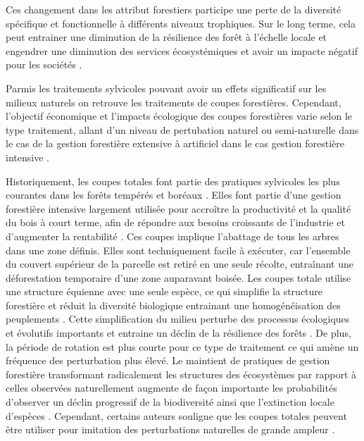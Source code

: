 Ces changement dans les attribut forestiers participe une perte de la diversité spécifique et fonctionnelle à différents niveaux trophiques. 
Sur le long terme, cela peut entrainer une diminution de la résilience des forêt à l'échelle locale et engendrer une diminution des services écosystémiques et avoir un impacte négatif pour les sociétés \citep{Hooper2012globalsynthesis,Edwards2014Maintainingecosystem}. 

Parmis les traitements sylvicoles pouvant avoir un effets significatif sur les milieux naturels on retrouve les traitements de coupes forestières.
Cependant, l'objectif économique et l'impacts écologique des coupes forestières varie selon le type traitement, allant d'un niveau de pertubation naturel ou semi-naturelle dans le cas de la gestion forestière extensive à artificiel dans le cas gestion forestière intensive \citep{Ameray2021Forestcarbon}. 

Historiquement, les coupes totales font partie des pratiques sylvicoles les plus courantes dans les forêts tempérés et boréaux \citep{Fedrowitz2014Canretention,Chaudhary2016Impactforest}. 
Elles font partie d'une gestion forestière intensive largement utilisée pour accroître la productivité et la qualité du bois à court terme, afin de répondre aux besoins croissants de l'industrie et d'augmenter la rentabilité \citep{Irland2011TimberProductivitya}.
Ces coupes implique l'abattage de tous les arbres dans une zone définis.
Elles sont techniquement facile à exécuter, car l'ensemble du couvert supérieur de la parcelle est retiré en une seule récolte, entraînant une déforestation temporaire d'une zone auparavant boisée. 
Les coupes totale utilise une structure équienne avec une seule espèce, ce qui simplifie la structure forestière et réduit la diversité biologique entrainant une homogénéisation des peuplements \citep{Rosenvald2008whatwhen}. 
Cette simplification du milieu perturbe des processus écologiques et évolutifs importants et entraine un déclin de la résilience des forêts \citep{Holling2001UnderstandingComplexity}. 
De plus, la période de rotation est plus courte pour ce type de traitement ce qui amène un fréquence des perturbation plus élevé. 
Le maintient de pratiques de gestion forestière transformant radicalement les structures des écosystèmes par rapport à celles observées naturellement augmente de façon importante les probabilités d'observer un déclin progressif de la biodiversité ainsi que l'extinction locale d'espèces \citep{Hanski2000Extinctiondebt}.  
Cependant, certains auteurs souligne que les coupes totales peuvent être utiliser pour imitation des perturbations naturelles de grande ampleur \citep{Greenberg1995comparisonbird}. 

